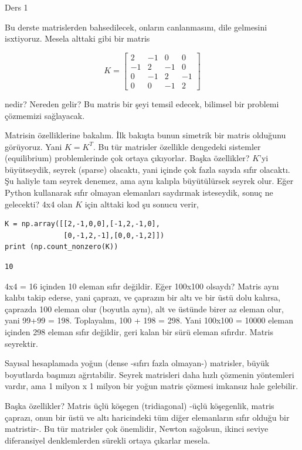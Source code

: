 \documentclass[12pt,fleqn]{article}\usepackage{../../common}
\begin{document}
Ders 1

Bu derste matrislerden bahsedilecek, onların canlanmasını, dile gelmesini
isxtiyoruz. Mesela alttaki gibi bir matris

$$ 
K =
\left[\begin{array}{rrrr}
2 & -1 & 0 & 0\\
-1 & 2 & -1 & 0\\
0 & -1 & 2 & -1\\
0 & 0 & -1 & 2
\end{array}\right]
 $$

nedir? Nereden gelir? Bu matris bir şeyi temsil edecek, bilimsel bir
problemi çözmemizi sağlayacak. 

Matrisin özelliklerine bakalım. İlk bakışta bunun simetrik bir matris
olduğunu görüyoruz. Yani $K = K^T$. Bu tür matrisler özellikle dengedeki
sistemler (equilibrium) problemlerinde çok ortaya çıkıyorlar. Başka
özellikler? $K$'yi büyütseydik, seyrek (sparse) olacaktı, yani içinde çok
fazla sayıda sıfır olacaktı. Şu haliyle tam seyrek denemez, ama aynı
kalıpla büyütülürsek seyrek olur. Eğer Python kullanarak sıfır olmayan
elemanları saydırmak isteseydik, sonuç ne gelecekti? 4x4 olan $K$ için
alttaki kod şu sonucu verir,

\begin{verbatim}
K = np.array([[2,-1,0,0],[-1,2,-1,0],
              [0,-1,2,-1],[0,0,-1,2]])
print (np.count_nonzero(K))
\end{verbatim}

\begin{verbatim}
10
\end{verbatim}

4x4 = 16 içinden 10 eleman sıfır değildir. Eğer 100x100 olsaydı? Matris
aynı kalıbı takip ederse, yani çaprazı, ve çaprazın bir altı ve bir üstü
dolu kalırsa, çaprazda 100 eleman olur (boyutla aynı), alt ve üstünde birer
az eleman olur, yani 99+99 = 198. Toplayalım, 100 + 198 = 298. Yani 100x100
= 10000 eleman içinden 298 eleman sıfır değildir, geri kalan bir sürü
eleman sıfırdır. Matris seyrektir.

Sayısal hesaplamada yoğun (dense -sıfırı fazla olmayan-) matrisler, büyük
boyutlarda başımızı ağrıtabilir. Seyrek matrisleri daha hızlı çözmenin
yöntemleri vardır, ama 1 milyon x 1 milyon bir yoğun matris çözmesi imkansız
hale gelebilir.

Başka özellikler? Matris üçlü köşegen (tridiagonal) -üçlü köşegenlik, matris
çaprazı, onun bir üstü ve altı haricindeki tüm diğer elemanların sıfır olduğu
bir matristir-. Bu tür matrisler çok önemlidir, Newton sağolsun, ikinci seviye
diferansiyel denklemlerden sürekli ortaya çıkarlar mesela.
\end{document}
